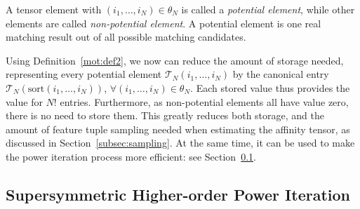 A tensor element with $(i_1,\ldots,i_N)\in \theta_N$ is called a \emph{potential element}, while other elements are called \emph{non-potential element}.
A potential element is one real matching result out of all possible matching candidates.


Using Definition~\ref{mot:def2}, we now can reduce the amount of storage needed, representing every potential element $\mathcal{T}_N(i_1,\ldots,i_N)$ by the canonical entry $\mathcal{T}_N(\mathrm{sort}(i_1,\ldots,i_N))$, $\forall (i_1,\ldots,i_N)\in \theta_N$. Each stored value thus provides the value for $N!$ entries.
Furthermore, as non-potential elements all have value zero, there is no need to store them.
This greatly reduces both storage, and the amount of feature tuple sampling
needed  when estimating the affinity tensor, as discussed in Section~\ref{subsec:sampling}.
At the same time, it can be used to make the power iteration process more efficient: see Section~\ref{subsec:oursymmhopm}.

\subsection{Supersymmetric Higher-order Power Iteration}
\label{subsec:oursymmhopm}

